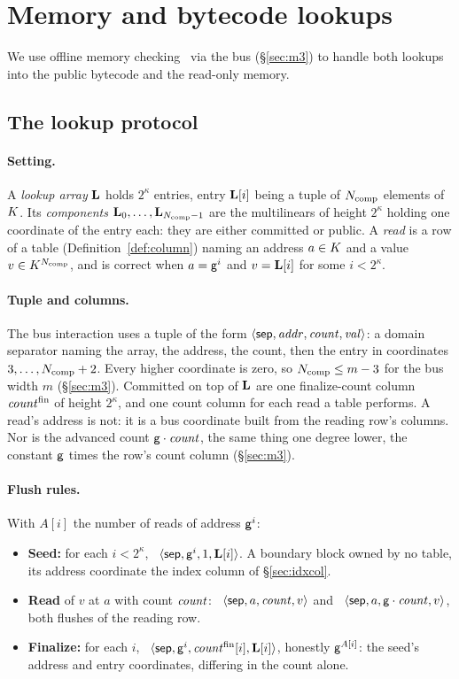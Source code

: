 \section{Memory and bytecode lookups}\label{sec:omc}

We use offline memory checking~\cite{BEGKN94} via the bus (\S\ref{sec:m3}) to handle both lookups into the public bytecode and the read-only memory.

\subsection{The lookup protocol}\label{sec:lookup}

\paragraph{Setting.} A \emph{lookup array} $\mathbf{L}$ holds $2^{\kappa}$ entries, entry $\mathbf{L}[i]$ being a tuple of $N_{\mathrm{comp}}$ elements of $K$. Its \emph{components} $\mathbf{L}_0,\dots,\mathbf{L}_{N_{\mathrm{comp}}-1}$ are the multilinears of height $2^{\kappa}$ holding one coordinate of the entry each: they are either committed or public. A \emph{read} is a row of a table (Definition~\ref{def:column}) naming an address $a\in K$ and a value $v\in K^{N_{\mathrm{comp}}}$, and is correct when $a=\mathsf{g}^{i}$ and $v=\mathbf{L}[i]$ for some $i<2^{\kappa}$.

\paragraph{Tuple and columns.} The bus interaction uses a tuple of the form $\langle \mathsf{sep},\mathit{addr},\mathit{count},\mathit{val} \rangle$: a domain separator naming the array, the address, the count, then the entry in coordinates $3,\dots,N_{\mathrm{comp}}+2$. Every higher coordinate is zero, so $N_{\mathrm{comp}}\le m-3$ for the bus width $m$ (\S\ref{sec:m3}). Committed on top of $\mathbf{L}$ are one finalize-count column $\mathit{count}^{\mathrm{fin}}$ of height $2^{\kappa}$, and one count column for each read a table performs. A read's address is not: it is a bus coordinate built from the reading row's columns. Nor is the advanced count $\mathsf{g}\cdot\mathit{count}$, the same thing one degree lower, the constant $\mathsf{g}$ times the row's count column (\S\ref{sec:m3}).

\paragraph{Flush rules.} With $A[i]$ the number of reads of address $\mathsf{g}^{i}$:
\begin{itemize}
\item \textbf{Seed:} for each $i<2^{\kappa}$, \push\ $\langle \mathsf{sep},\mathsf{g}^{i},1,\mathbf{L}[i] \rangle$. A boundary block owned by no table, its address coordinate the index column of \S\ref{sec:idxcol}.
\item \textbf{Read} of $v$ at $a$ with count $\mathit{count}$: \pull\ $\langle \mathsf{sep},a,\mathit{count},v \rangle$ and \push\ $\langle \mathsf{sep},a,\mathsf{g}\cdot\mathit{count},v \rangle$, both flushes of the reading row.
\item \textbf{Finalize:} for each $i$, \pull\ $\langle \mathsf{sep},\mathsf{g}^{i},\mathit{count}^{\mathrm{fin}}[i],\mathbf{L}[i] \rangle$, honestly $\mathsf{g}^{A[i]}$: the seed's address and entry coordinates, differing in the count alone.
\end{itemize}

